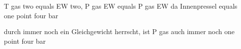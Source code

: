 T gas two equals EW two, P gas EW equals P gas EW da Innenpressel equals one point four bar  

durch immer noch ein Gleichgewicht herrscht, ist P gas auch immer noch one point four bar